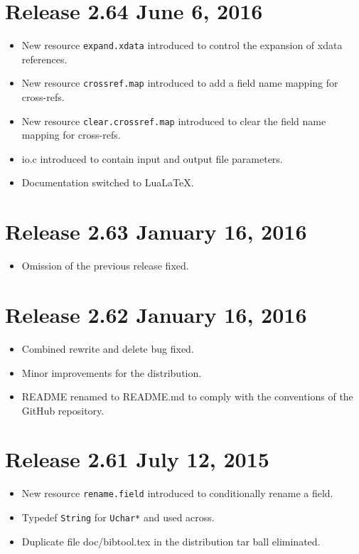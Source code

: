 \documentclass[11pt,a4paper]{scrartcl}
\newcommand\rsc[1]{\texttt{#1}}
\newcommand\File[1]{\textsf{#1}}
\newenvironment{Release}[2]{%
  \def\tmp{#2}%
  \section*{Release #1 \ifx\tmp\empty\else{\normalsize[#2]}\fi}
  \begin{itemize}
}{\end{itemize}}
\newenvironment{Fix}[1]{\item }{}
\newenvironment{New}[1]{\item }{}
\newenvironment{Update}[1]{\item }{}
\begin{document}
\begin{multicols}
 \begin{Release}{2.64}{June 6, 2016}
  \begin{New}{gene}
    New resource \rsc{expand.xdata} introduced to control the
    expansion of xdata references.
  \end{New}
  \begin{New}{gene}
    New resource \rsc{crossref.map} introduced to add a field name
    mapping for cross-refs.
  \end{New}
  \begin{New}{gene}
    New resource \rsc{clear.crossref.map} introduced to clear the
    field name mapping for cross-refs.
  \end{New}
  \begin{Update}{gene}
    \File{io.c} introduced to contain input and output file parameters.
  \end{Update}
  \begin{Update}{gene}
    Documentation switched to Lua\LaTeX.
  \end{Update}
 \end{Release}

 \begin{Release}{2.63}{January 16, 2016}
  \begin{Fix}{gene}
    Omission of the previous release fixed.
  \end{Fix}
 \end{Release}

 \begin{Release}{2.62}{January 16, 2016}
  \begin{Fix}{gene}
    Combined rewrite and delete bug fixed.
  \end{Fix}
  \begin{Update}{gene}
    Minor improvements for the distribution.
  \end{Update}
  \begin{Update}{gene}
    \File{README} renamed to \File{README.md} to comply with the
    conventions of the GitHub repository.
  \end{Update}
 \end{Release}

 \begin{Release}{2.61}{July 12, 2015}
  \begin{New}{gene}
    New resource \rsc{rename.field} introduced to conditionally rename a
    field.
  \end{New}
  \begin{Update}{gene}
    Typedef \verb|String| for \verb|Uchar*| and used across.
  \end{Update}
  \begin{Fix}{gene}
    Duplicate file \File{doc/bibtool.tex} in the distribution tar ball
    eliminated.
  \end{Fix}
 \end{Release}


\end{multicols}
\end{document}

